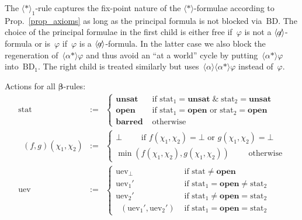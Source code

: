 \documentclass{entcs}
\newcommand{\xand}{\;\&\;}
\newcommand{\xor}{\text{ or }}
\newcommand{\pea}[2]{\langle#1\rangle #2}
\newcommand{\prp}[1]{#1*}
\newcommand{\fean}{$\pea{\not\!\!a}{}$}
\newcommand{\fear}{$\pea{\prp{}}{}$}
\newcommand{\tbdia}{\mathrm{BD}}
\newcommand{\tmrk}{\mathrm{stat}}
\newcommand{\tuev}{\mathrm{uev}}
\newcommand{\tbeta}{\boldsymbol{\beta}}
\newcommand{\trero}{$\pea{\prp{}}{}_1$}
\newcommand{\ttrue}{\mathbf{unsat}}
\newcommand{\tloop}{\mathbf{barred}}
\newcommand{\tfalse}{\mathbf{open}}
\newcommand{\tmin}{\mathop{\mathrm{min}_{\bot}}}
\begin{document}
The \trero{}-rule captures the fix-point nature of the \fear{}-formulae
according to Prop.~\ref{prop_axioms}
as long as the principal formula is not blocked via~$\tbdia$.
The choice of the principal formulae in the first child is either free
if~$\varphi$ is not a \fean{}-formula
or is~$\varphi$ if~$\varphi$ is a \fean{}-formula.
In the latter case we also block the regeneration of~$\pea{\prp{\alpha}}{\varphi}$
and thus avoid an ``at a world'' cycle by putting~$\pea{\prp{\alpha}}{\varphi}$ into~$\tbdia_1$.
The right child is treated similarly
but uses~$\pea{\alpha}{\pea{\prp{\alpha}}{\varphi}}$ instead of~$\varphi$.
\begin{flushleft}
  Actions for all $\tbeta$-rules: 
  \begin{eqnarray*}
    \tmrk & := &
    \left\{
      \begin{array}{ll}
        \ttrue & \text{ if } \tmrk_1 = \ttrue \xand \tmrk_2 = \ttrue\\
        \tfalse & \text{ if } \tmrk_1 = \tfalse \xor \tmrk_2 = \tfalse\\
        \tloop & \text{ otherwise }
      \end{array}
    \right .
    \\
    \tmin(f, g)(\chi_1, \chi_2) & := &
    \left\{
      \begin{array}{l}
        \bot \qquad \text{ if } f(\chi_1, \chi_2) = \bot \text{ or } g(\chi_1, \chi_2) = \bot\\
        \min(f(\chi_1, \chi_2), g(\chi_1, \chi_2)) \qquad \text{ otherwise}
      \end{array}
    \right .
    \\
    \tuev & := &
    \left\{
      \begin{array}{ll}
        \tuev_{\bot} & \text{ if } \tmrk \not= \tfalse\\
        \tuev_1' & \text{ if } \tmrk_1 = \tfalse \not= \tmrk_2\\
        \tuev_2' & \text{ if } \tmrk_1 \not= \tfalse = \tmrk_2\\
        \tmin(\tuev_1', \tuev_2') & \text{ if } \tmrk_1 = \tfalse = \tmrk_2
      \end{array}
    \right .
  \end{eqnarray*}
\end{flushleft}
\end{document}
